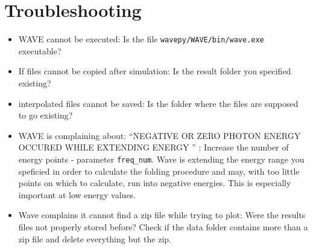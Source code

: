 \documentclass[
12pt,%
a4paper,  %
twoside        %
]{report}
\begin{document}
\chapter{Troubleshooting}

\begin{itemize}
\item WAVE cannot be executed: Is the file \verb+wavepy/WAVE/bin/wave.exe+ executable?
\item If files cannot be copied after simulation: Is the result folder you specified existing?
\item interpolated files cannot be saved: Is the folder where the files are supposed to go existing?
\item WAVE is complaining about: ``NEGATIVE OR ZERO PHOTON ENERGY OCCURED WHILE EXTENDING ENERGY '' : Increase the number of energy points - parameter \verb+freq_num+. Wave is extending the energy range you speficied in order to calculate the folding procedure and may, with too little points on which to calculate, run into negative energies. This is especially important at low energy values.
\item Wave complains it cannot find a zip file while trying to plot: Were the results files not properly stored before? Check if the data folder contains more than a zip file and delete everything but the zip.
\end{itemize}
\end{document}
